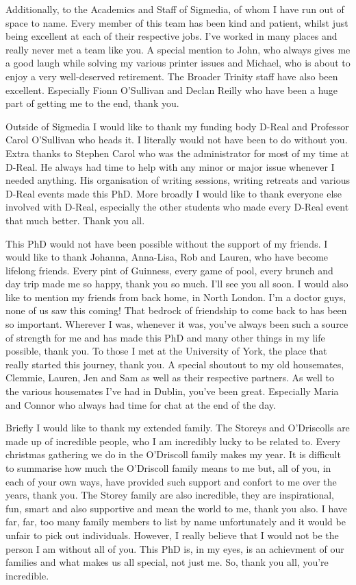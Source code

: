 Additionally, to the Academics and Staff of Sigmedia, of whom I have run out of space to name. Every member of this team has been kind and patient, whilst just being excellent at each of their respective jobs. I've worked in many places and really never met a team like you. A special mention to John, who always gives me a good laugh while solving my various printer issues and Michael, who is about to enjoy a very well-deserved retirement. The Broader Trinity staff have also been excellent. Especially Fionn O'Sullivan and Declan Reilly who have been a huge part of getting me to the end, thank you.

Outside of Sigmedia I would like to thank my funding body D-Real and Professor Carol O'Sullivan who heads it. I literally would not have been to do without you. Extra thanks to Stephen Carol who was the administrator for most of my time at D-Real. He always had time to help with any minor or major issue whenever I needed anything. His organisation of writing sessions, writing retreats and various D-Real events made this PhD. More broadly I would like to thank everyone else involved with D-Real, especially the other students who made every D-Real event that much better. Thank you all.

This PhD would not have been possible without the support of my friends. I would like to thank Johanna, Anna-Lisa, Rob and Lauren, who have become lifelong friends. Every pint of Guinness, every game of pool, every brunch and day trip made me so happy, thank you so much. I'll see you all soon. I would also like to mention my friends from back home, in North London. I'm a doctor guys, none of us saw this coming! That bedrock of friendship to come back to has been so important. Wherever I was, whenever it was, you've always been such a source of strength for me and has made this PhD and many other things in my life possible, thank you. To those I met at the University of York, the place that really started this journey, thank you. A special shoutout to my old housemates, Clemmie, Lauren, Jen and Sam as well as their respective partners. As well to the various housemates I've had in Dublin, you've been great. Especially Maria and Connor who always had time for chat at the end of the day.

Briefly I would like to thank my extended family. The Storeys and O'Driscolls are made up of incredible people, who I am incredibly lucky to be related to. Every christmas gathering we do in the O'Driscoll family makes my year. It is difficult to summarise how much the O'Driscoll family means to me but, all of you, in each of your own ways, have provided such support and confort to me over the years, thank you. The Storey family are also incredible, they are inspirational, fun, smart and also supportive and mean the world to me, thank you also. I have far, far, too many family members to list by name unfortunately and it would be unfair to pick out individuals. However, I really believe that I would not be the person I am without all of you. This PhD is, in my eyes, is an achievment of our families and what makes us all special, not just me. So, thank you all, you're incredible. 

